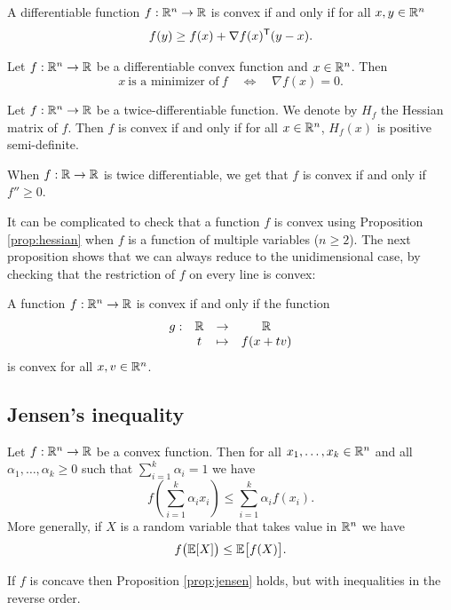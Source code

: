 \documentclass[11pt,nocut]{article}
\begin{document}
\begin{proposition}
	A differentiable function $f: \mathbb{R}^n \to \mathbb{R}$ is convex if and only if for all $x,y \in \mathbb{R}^n$
	$$
	f(y) \geq f(x) + \nabla f(x)^{{\sf T}} (y-x).
	$$
\end{proposition}

\begin{corollary}
	Let $f: \mathbb{R}^n \to \mathbb{R}$ be a differentiable convex function and $x \in \mathbb{R}^n$. Then
	$$
	x \ \text{is a minimizer of} \ f
	\quad \Longleftrightarrow \quad \nabla f(x) = 0.
	$$
\end{corollary}

\begin{proposition}\label{prop:hessian}
	Let $f: \mathbb{R}^n \to \mathbb{R}$ be a twice-differentiable function. We denote by $H_f$ the Hessian matrix of $f$.
	Then $f$ is convex if and only if for all $x \in \mathbb{R}^n$, $H_f(x)$ is positive semi-definite.
\end{proposition}
When $f: \mathbb{R} \to \mathbb{R}$ is twice differentiable, we get that $f$ is convex if and only if $f'' \geq 0$.

It can be complicated to check that a function $f$ is convex using Proposition \ref{prop:hessian} when $f$ is a function of multiple variables ($n \geq 2$). The next proposition shows that we can always reduce to the unidimensional case, by checking that the restriction of $f$ on every line is convex:

\begin{proposition}
	A function $f: \mathbb{R}^n \to \mathbb{R}$ is convex if and only if the function
	$$
	\begin{array}{rccc}
		g: & \mathbb{R} & \to & \mathbb{R} \\
		   & t & \mapsto & f(x+t v)
	\end{array}
	$$
	is convex for all $x,v \in \mathbb{R}^n$.
\end{proposition}

\subsection{Jensen's inequality}

\begin{proposition}\label{prop:jensen}
	Let $f: \mathbb{R}^n \to \mathbb{R}$ be a convex function. Then for all $x_1, \dots, x_k \in \mathbb{R}^n$ and all $\alpha_1, \dots, \alpha_k \geq 0$ such that $\sum_{i=1}^k \alpha_i = 1$ we have
	$$
	f\left(\sum_{i=1}^k \alpha_i x_i \right) \leq \sum_{i=1}^k \alpha_i f(x_i).
	$$
	More generally, if $X$ is a random variable that takes value in $\mathbb{R}^n$ we have
	$$
	f\big(\mathbb{E} [X]\big) \leq \mathbb{E} \big[f(X)\big].
	$$
\end{proposition}
\begin{remark}
	If $f$ is concave then Proposition \ref{prop:jensen} holds, but with inequalities in the reverse order.
\end{remark}
\end{document}
